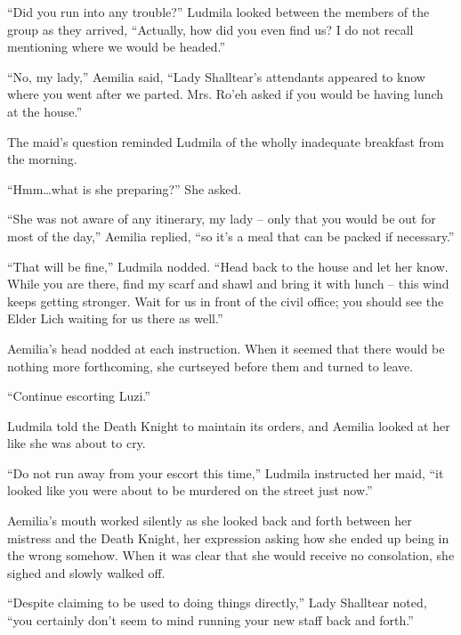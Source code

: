  

“Did you run into any trouble?” Ludmila looked between the members of the group as they arrived, “Actually, how did you even find us? I do not recall mentioning where we would be headed.”

 

“No, my lady,” Aemilia said, “Lady Shalltear’s attendants appeared to know where you went after we parted. Mrs. Ro’eh asked if you would be having lunch at the house.”

 

The maid’s question reminded Ludmila of the wholly inadequate breakfast from the morning.

 

“Hmm…what is she preparing?” She asked.

 

“She was not aware of any itinerary, my lady – only that you would be out for most of the day,” Aemilia replied, “so it’s a meal that can be packed if necessary.”

 

“That will be fine,” Ludmila nodded. “Head back to the house and let her know. While you are there, find my scarf and shawl and bring it with lunch – this wind keeps getting stronger. Wait for us in front of the civil office; you should see the Elder Lich waiting for us there as well.”

 

Aemilia’s head nodded at each instruction. When it seemed that there would be nothing more forthcoming, she curtseyed before them and turned to leave.

 

“Continue escorting Luzi.”

 

Ludmila told the Death Knight to maintain its orders, and Aemilia looked at her like she was about to cry.

 

“Do not run away from your escort this time,” Ludmila instructed her maid, “it looked like you were about to be murdered on the street just now.”

 

Aemilia’s mouth worked silently as she looked back and forth between her mistress and the Death Knight, her expression asking how she ended up being in the wrong somehow. When it was clear that she would receive no consolation, she sighed and slowly walked off.

 

“Despite claiming to be used to doing things directly,” Lady Shalltear noted, “you certainly don’t seem to mind running your new staff back and forth.”

